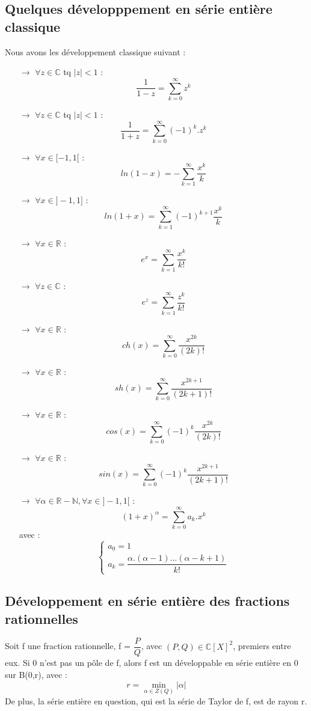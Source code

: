 \subsection{Quelques développpement en série entière classique}
Nous avons les développement classique suivant : 
\begin{itemize}
 \item[$\rightarrow$] $\forall z \in \mathbb{C}$ tq $|z|<1$ : $$\dfrac{1}{1-z} = \sum_{k=0}^{\infty} z^k$$
 \item[$\rightarrow$] $\forall z \in \mathbb{C}$ tq $|z|<1$ : $$\dfrac{1}{1+z} = \sum_{k=0}^{\infty} (-1)^k.z^k$$
 \item[$\rightarrow$] $\forall x \in [-1,1[$ :  $$ln(1-x) = -\sum_{k=1}^{\infty} \dfrac{x^{k}}{k}$$
 \item[$\rightarrow$] $\forall x \in ]-1,1]$ : $$ln(1+x) = \sum_{k=1}^{\infty} (-1)^{k+1}\dfrac{x^{k}}{k}$$
 \item[$\rightarrow$] $\forall x \in \mathbb{R}$ : $$e^x = \sum_{k=1}^{\infty} \dfrac{x^k}{k!}$$
 \item[$\rightarrow$] $\forall z \in \mathbb{C}$ : $$e^z = \sum_{k=1}^{\infty} \dfrac{z^k}{k!}$$
\item[$\rightarrow$] $\forall x \in \mathbb{R}$ : $$ch(x) = \sum_{k=0}^{\infty} \dfrac{x^{2k}}{(2k)!}$$
\item[$\rightarrow$] $\forall x \in \mathbb{R}$ : $$sh(x) = \sum_{k=0}^{\infty} \dfrac{x^{2k+1}}{(2k+1)!}$$
\item[$\rightarrow$] $\forall x \in \mathbb{R}$ : $$cos(x) = \sum_{k=0}^{\infty} (-1)^k \dfrac{x^{2k}}{(2k)!}$$
 \item[$\rightarrow$] $\forall x \in \mathbb{R}$ : $$sin(x) = \sum_{k=0}^{\infty} (-1)^k \dfrac{x^{2k+1}}{(2k+1)!}$$
 \item[$\rightarrow$] $\forall \alpha \in \mathbb{R}-\mathbb{N}, \forall x \in ]-1,1[$ : $$(1+x)^{\alpha} = \sum_{k=0}^{\infty} a_k.x^k$$
avec : 
$$\begin{cases}
  a_0 = 1 \\
  a_k = \dfrac{\alpha.(\alpha-1)...(\alpha-k+1)}{k!}
  \end{cases}
$$
\end{itemize}
\subsection{Développement en série entière des fractions rationnelles}
\begin{prop}
Soit f une fraction rationnelle, f = $\dfrac{P}{Q}$, avec $(P,Q) \in \mathbb{C}[X]^2$, premiers entre eux. Si 0 n'est pas un pôle de f, alors f est un développable en série entière en 0 sur B(0,r), avec :
$$r = \underset{\alpha \in Z(Q)}\min |\alpha|$$
De plus, la série entière en question, qui est la série de Taylor de f, est de rayon r.
\end{prop}
